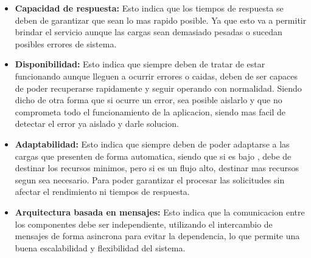 \documentclass[12pt]{article}
\begin{document}
\begin{itemize}
    \item\textbf{Capacidad de respuesta:} Esto indica que los tiempos de respuesta se deben de garantizar que sean lo mas rapido posible. Ya que esto va a permitir  brindar el servicio aunque las cargas sean demasiado pesadas o sucedan posibles errores de sistema. 
    \item\textbf{Disponibilidad:} Esto indica que siempre deben de tratar de estar funcionando aunque lleguen a ocurrir errores o caidas, deben de ser capaces de poder recuperarse rapidamente y seguir operando con normalidad. Siendo dicho de otra forma que si ocurre un error, sea posible aislarlo y que no comprometa todo el funcionamiento de la aplicacion, siendo mas facil de detectar el error ya aislado y darle solucion. 
    \item \textbf{Adaptabilidad:} Esto indica que siempre deben de poder adaptarse a las cargas que presenten de forma automatica, siendo que si es bajo , debe de destinar los recursos minimos, pero si es un flujo alto, destinar mas recursos segun sea necesario. Para poder garantizar el procesar las solicitudes sin afectar el rendimiento ni tiempos de respuesta.
    \item\textbf{Arquitectura basada en mensajes:} Esto indica que la comunicacion entre los componentes debe ser independiente, utilizando el intercambio de mensajes de forma asincrona para evitar la dependencia, lo que permite una buena escalabilidad y flexibilidad del sistema.

\end{itemize}
\end{document}
